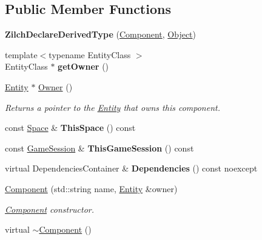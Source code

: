 \subsection*{Public Member Functions}
\begin{DoxyCompactItemize}
\item 
\hypertarget{classDCEngine_1_1Component_a1d463d431a354f09864b0eb6dbce8ef2}{{\bfseries Zilch\-Declare\-Derived\-Type} (\hyperlink{classDCEngine_1_1Component}{Component}, \hyperlink{classDCEngine_1_1Object}{Object})}\label{classDCEngine_1_1Component_a1d463d431a354f09864b0eb6dbce8ef2}

\item 
\hypertarget{classDCEngine_1_1Component_a450b904300903683f54b2a2da772c485}{{\footnotesize template$<$typename Entity\-Class $>$ }\\Entity\-Class $\ast$ {\bfseries get\-Owner} ()}\label{classDCEngine_1_1Component_a450b904300903683f54b2a2da772c485}

\item 
\hyperlink{classDCEngine_1_1Entity}{Entity} $\ast$ \hyperlink{classDCEngine_1_1Component_ac294dc4c0ae2a6399bac40eef58287f7}{Owner} ()
\begin{DoxyCompactList}\small\item\em Returns a pointer to the \hyperlink{classDCEngine_1_1Entity}{Entity} that owns this component. \end{DoxyCompactList}\item 
\hypertarget{classDCEngine_1_1Component_a42de2ed8b4f78dbed97ef84ae84dbb8d}{const \hyperlink{classDCEngine_1_1Space}{Space} \& {\bfseries This\-Space} () const }\label{classDCEngine_1_1Component_a42de2ed8b4f78dbed97ef84ae84dbb8d}

\item 
\hypertarget{classDCEngine_1_1Component_ac236b6a79ede3fccdcbcd7774d6979f0}{const \hyperlink{classDCEngine_1_1GameSession}{Game\-Session} \& {\bfseries This\-Game\-Session} () const }\label{classDCEngine_1_1Component_ac236b6a79ede3fccdcbcd7774d6979f0}

\item 
\hypertarget{classDCEngine_1_1Component_a1b038e80a5b7786e8d3f4805351d56fc}{virtual Dependencies\-Container \& {\bfseries Dependencies} () const noexcept}\label{classDCEngine_1_1Component_a1b038e80a5b7786e8d3f4805351d56fc}

\item 
\hyperlink{classDCEngine_1_1Component_a74bd2d9c7b69be0c75322bc2ba496f88}{Component} (std\-::string name, \hyperlink{classDCEngine_1_1Entity}{Entity} \&owner)
\begin{DoxyCompactList}\small\item\em \hyperlink{classDCEngine_1_1Component}{Component} constructor. \end{DoxyCompactList}\item 
\hypertarget{classDCEngine_1_1Component_ac00f58512f2e5afa33f14007fd9c622e}{virtual \hyperlink{classDCEngine_1_1Component_ac00f58512f2e5afa33f14007fd9c622e}{$\sim$\-Component} ()}\label{classDCEngine_1_1Component_ac00f58512f2e5afa33f14007fd9c622e}


\end{DoxyCompactItemize}
